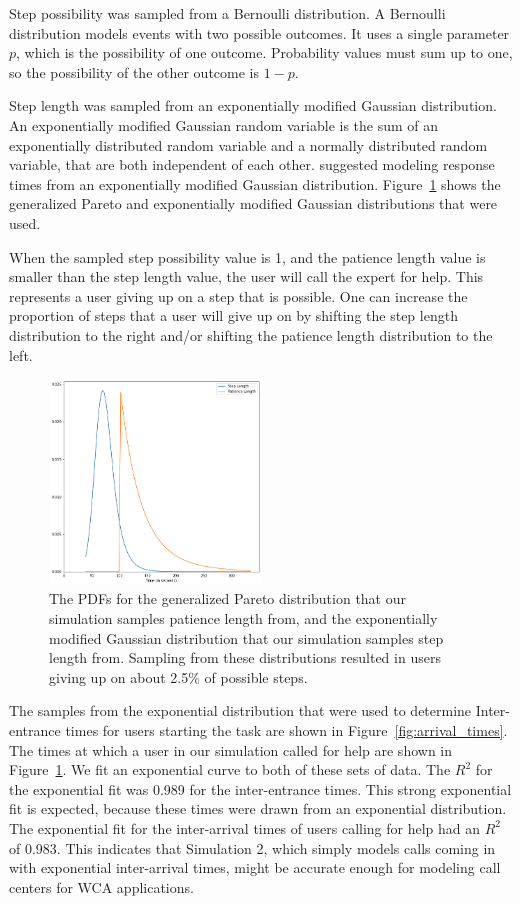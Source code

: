 Step possibility was sampled from a Bernoulli distribution.
A Bernoulli distribution models events with two possible outcomes.
It uses a single parameter $p$, which is the possibility of one outcome.
Probability values must sum up to one, so the possibility of the other outcome
is $1-p$.

Step length was sampled from an exponentially modified Gaussian distribution.
An exponentially modified Gaussian random variable is the sum of an
exponentially distributed random variable and a normally distributed random
variable, that are both independent of each other.
\citet{dawson1988fitting} suggested modeling response times from an
exponentially modified Gaussian distribution.
Figure~\ref{fig:step_patience} shows the generalized Pareto and exponentially
modified Gaussian distributions that were used.

When the sampled step possibility value is 1, and the patience length value is
smaller than the step length value, the user will call the expert for help.
This represents a user giving up on a step that is possible.
One can increase the proportion of steps that a user will give up on by shifting
the step length distribution to the right and/or shifting the patience length
distribution to the left.

\begin{figure}[h]
  \includegraphics[width=0.5\textwidth]{figures/montecarlo/step_patience.png}
  \caption{
    The PDFs for the generalized Pareto distribution that our simulation samples
    patience length from, and the exponentially modified Gaussian distribution
    that our simulation samples step length from.
    Sampling from these distributions resulted in users giving up on about 2.5\%
    of possible steps.
  }\label{fig:step_patience}
\end{figure}

The samples from the exponential distribution that were used to determine
Inter-entrance times for users starting the task are shown in
Figure~\ref{fig:arrival_times}.
The times at which a user in our simulation called for help are shown in
Figure~\ref{fig:step_patience}.
We fit an exponential curve to both of these sets of data.
The $R^2$ for the exponential fit was 0.989 for the inter-entrance times.
This strong exponential fit is expected, because these times were drawn from an
exponential distribution.
The exponential fit for the inter-arrival times of users calling for help had
an $R^2$ of 0.983.
This indicates that Simulation 2, which simply models calls coming in with
exponential inter-arrival times, might be accurate enough for modeling call
centers for WCA applications.

